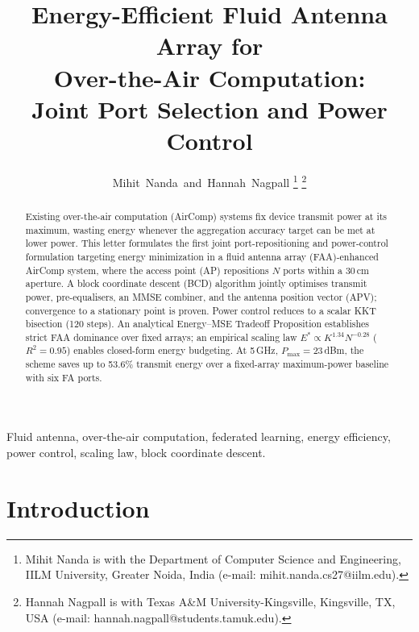 \documentclass[journal,letterpaper,10pt,twocolumn]{IEEEtran}
\begin{document}
\title{Energy-Efficient Fluid Antenna Array for\\
Over-the-Air Computation:\\
Joint Port Selection and Power Control}

\author{Mihit~Nanda~and~Hannah~Nagpall%
\thanks{Mihit Nanda is with the Department of Computer Science and Engineering,
IILM University, Greater Noida, India (e-mail: mihit.nanda.cs27@iilm.edu).}%
\thanks{Hannah Nagpall is with Texas A\&M University-Kingsville, Kingsville, TX, USA (e-mail: hannah.nagpall@students.tamuk.edu).}}

\maketitle

\begin{abstract}
Existing over-the-air computation (AirComp) systems fix device transmit
power at its maximum, wasting energy whenever the aggregation accuracy
target can be met at lower power. This letter formulates the first
joint port-repositioning and power-control formulation targeting energy
minimization in a fluid antenna array (FAA)-enhanced AirComp system,
where the access point (AP) repositions $N$ ports within a 30\,cm aperture. A block coordinate descent (BCD) algorithm jointly
optimises transmit power, pre-equalisers, an MMSE combiner, and the
antenna position vector (APV); convergence to a stationary point is
proven. Power control reduces to a scalar KKT bisection (120 steps).
An analytical Energy--MSE Tradeoff Proposition establishes strict FAA
dominance over fixed arrays; an empirical scaling law
$E^{*}\!\propto\!K^{1.34}N^{-0.28}$ ($R^{2}\!=\!0.95$) enables
closed-form energy budgeting. At 5\,GHz, $P_{\max}\!=\!23$\,dBm, the
scheme saves up to 53.6\% transmit energy over a fixed-array
maximum-power baseline with six FA ports.
\end{abstract}

\begin{IEEEkeywords}
Fluid antenna, over-the-air computation, federated learning, energy
efficiency, power control, scaling law, block coordinate descent.
\end{IEEEkeywords}

\section{Introduction}
\end{document}
